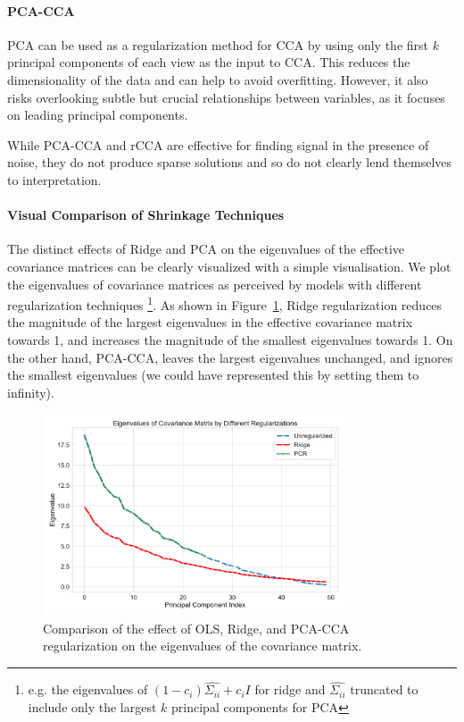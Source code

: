 \paragraph{PCA-CCA} PCA can be used as a regularization method for CCA by using only the first \( k \) principal components of each view as the input to CCA.
This reduces the dimensionality of the data and can help to avoid overfitting.
However, it also risks overlooking subtle but crucial relationships between variables, as it focuses on leading principal components.

While PCA-CCA and rCCA are effective for finding signal in the presence of noise, they do not produce sparse
solutions and so do not clearly lend themselves to interpretation.

\paragraph{Visual Comparison of Shrinkage Techniques}

The distinct effects of Ridge and PCA on the eigenvalues of the effective covariance matrices can be clearly visualized with a simple visualisation.
We plot the eigenvalues of covariance matrices as perceived by models with different regularization techniques \footnote{e.g. the eigenvalues of $(1 - c_i) \hat{\Sigma_{ii}} + c_i I$ for ridge and $\hat{\Sigma_{ii}}$ truncated to include only the largest $k$ principal components for PCA}.
As shown in Figure~\ref{fig:shrinkage}, Ridge regularization reduces the magnitude of the largest eigenvalues in the effective covariance matrix towards 1, and increases the magnitude of the smallest eigenvalues towards 1.
On the other hand, PCA-CCA, leaves the largest eigenvalues unchanged, and ignores the smallest eigenvalues (we could have represented this by setting them to infinity).

\begin{figure}
    \centering
    \includegraphics[width=0.8\textwidth]{figures/shrinkage/shrinkage}
    \caption{Comparison of the effect of OLS, Ridge, and PCA-CCA regularization on the eigenvalues of the covariance matrix.}\label{fig:shrinkage}
\end{figure}

